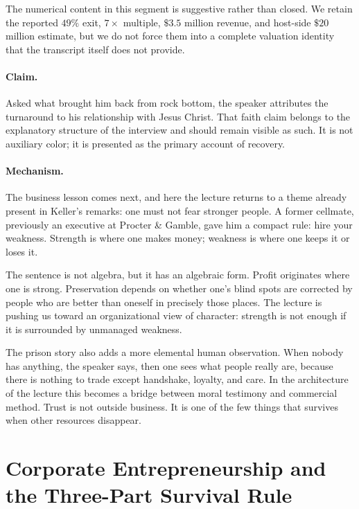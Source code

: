 \begin{remark}
The numerical content in this segment is suggestive rather than closed. We retain the reported \(49\%\) exit, \(7\times\) multiple, \(\$3.5\) million revenue, and host-side \(\$20\) million estimate, but we do not force them into a complete valuation identity that the transcript itself does not provide.
\end{remark}

\paragraph{Claim.} Asked what brought him back from rock bottom, the speaker attributes the turnaround to his relationship with Jesus Christ. That faith claim belongs to the explanatory structure of the interview and should remain visible as such. It is not auxiliary color; it is presented as the primary account of recovery.

\paragraph{Mechanism.} The business lesson comes next, and here the lecture returns to a theme already present in Keller's remarks: one must not fear stronger people. A former cellmate, previously an executive at Procter \& Gamble, gave him a compact rule: hire your weakness. Strength is where one makes money; weakness is where one keeps it or loses it.

The sentence is not algebra, but it has an algebraic form. Profit originates where one is strong. Preservation depends on whether one's blind spots are corrected by people who are better than oneself in precisely those places. The lecture is pushing us toward an organizational view of character: strength is not enough if it is surrounded by unmanaged weakness.

The prison story also adds a more elemental human observation. When nobody has anything, the speaker says, then one sees what people really are, because there is nothing to trade except handshake, loyalty, and care. In the architecture of the lecture this becomes a bridge between moral testimony and commercial method. Trust is not outside business. It is one of the few things that survives when other resources disappear.

\section{Corporate Entrepreneurship and the Three-Part Survival Rule}

